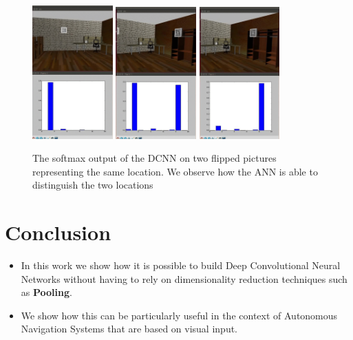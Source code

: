 \documentclass[a0, portrait]{IWIposter}
\begin{document}
\begin{multicols}{3}
\begin{figure}
        \includegraphics[width=0.275\textwidth]{position1.png}
        \hfill
        \includegraphics[width=0.275\textwidth]{position2.png}
	\hfill
	\includegraphics[width=0.275\textwidth]{position3.png}
	\caption{The softmax output of the DCNN on two flipped pictures representing the same location. We observe how the ANN is able to distinguish the two locations}
	\label{fig:SoftmaxOutput}
\end{figure}



\section*{Conclusion}

\begin{itemize}
	\item In this work we show how it is possible to build Deep Convolutional Neural Networks without having to rely on dimensionality reduction techniques such as \textbf{Pooling}.
	\item We show how this can be particularly useful in the context of Autonomous Navigation Systems that are based on visual input. 

\end{itemize}




\end{multicols}
\end{document}
